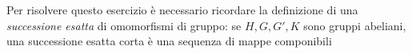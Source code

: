 Per risolvere questo esercizio è necessario ricordare la definizione di una \emph{successione esatta} di omomorfismi di gruppo: se \(H,G,G',K\) sono gruppi abeliani, una successione esatta corta è una sequenza di mappe componibili

